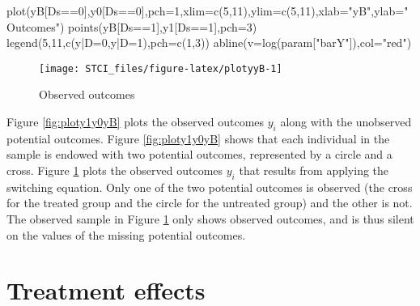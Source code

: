 \documentclass[
]{book}
\newenvironment{Shaded}{\begin{snugshade}}{\end{snugshade}}
\newcommand{\AttributeTok}[1]{\textcolor[rgb]{0.77,0.63,0.00}{#1}}
\newcommand{\DecValTok}[1]{\textcolor[rgb]{0.00,0.00,0.81}{#1}}
\newcommand{\FunctionTok}[1]{\textcolor[rgb]{0.00,0.00,0.00}{#1}}
\newcommand{\NormalTok}[1]{#1}
\newcommand{\SpecialCharTok}[1]{\textcolor[rgb]{0.00,0.00,0.00}{#1}}
\newcommand{\StringTok}[1]{\textcolor[rgb]{0.31,0.60,0.02}{#1}}
\theoremstyle{definition}
\theoremstyle{definition}
\theoremstyle{definition}
\theoremstyle{definition}
\theoremstyle{remark}
\begin{document}
\begin{Shaded}
\begin{Highlighting}[]
\FunctionTok{plot}\NormalTok{(yB[Ds}\SpecialCharTok{==}\DecValTok{0}\NormalTok{],y0[Ds}\SpecialCharTok{==}\DecValTok{0}\NormalTok{],}\AttributeTok{pch=}\DecValTok{1}\NormalTok{,}\AttributeTok{xlim=}\FunctionTok{c}\NormalTok{(}\DecValTok{5}\NormalTok{,}\DecValTok{11}\NormalTok{),}\AttributeTok{ylim=}\FunctionTok{c}\NormalTok{(}\DecValTok{5}\NormalTok{,}\DecValTok{11}\NormalTok{),}\AttributeTok{xlab=}\StringTok{"yB"}\NormalTok{,}\AttributeTok{ylab=}\StringTok{"Outcomes"}\NormalTok{)}
\FunctionTok{points}\NormalTok{(yB[Ds}\SpecialCharTok{==}\DecValTok{1}\NormalTok{],y1[Ds}\SpecialCharTok{==}\DecValTok{1}\NormalTok{],}\AttributeTok{pch=}\DecValTok{3}\NormalTok{)}
\FunctionTok{legend}\NormalTok{(}\DecValTok{5}\NormalTok{,}\DecValTok{11}\NormalTok{,}\FunctionTok{c}\NormalTok{(}\StringTok{\textquotesingle{}y|D=0\textquotesingle{}}\NormalTok{,}\StringTok{\textquotesingle{}y|D=1\textquotesingle{}}\NormalTok{),}\AttributeTok{pch=}\FunctionTok{c}\NormalTok{(}\DecValTok{1}\NormalTok{,}\DecValTok{3}\NormalTok{))}
\FunctionTok{abline}\NormalTok{(}\AttributeTok{v=}\FunctionTok{log}\NormalTok{(param[}\StringTok{"barY"}\NormalTok{]),}\AttributeTok{col=}\StringTok{"red"}\NormalTok{)}
\end{Highlighting}
\end{Shaded}

\begin{figure}

{\centering \texttt{[image: STCI\_files/figure-latex/plotyyB-1]} 

}

\caption{Observed outcomes}\label{fig:plotyyB}
\end{figure}

Figure \ref{fig:ploty1y0yB} plots the observed outcomes \(y_i\) along with the unobserved potential outcomes.
Figure \ref{fig:ploty1y0yB} shows that each individual in the sample is endowed with two potential outcomes, represented by a circle and a cross.
Figure \ref{fig:plotyyB} plots the observed outcomes \(y_i\) that results from applying the switching equation.
Only one of the two potential outcomes is observed (the cross for the treated group and the circle for the untreated group) and the other is not.
The observed sample in Figure \ref{fig:plotyyB} only shows observed outcomes, and is thus silent on the values of the missing potential outcomes.

\hypertarget{treatment-effects}{%
\section{Treatment effects}\label{treatment-effects}}
\end{document}
